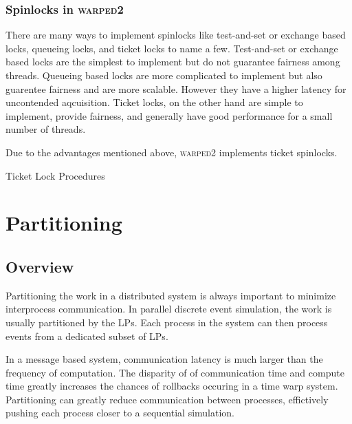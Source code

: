 \documentclass[11pt]{book}
\begin{document}
\subsection{Spinlocks in \textsc{warped2}}

There are many ways to implement spinlocks like test-and-set or exchange based locks,
queueing locks, and ticket locks to name a few. Test-and-set or exchange based locks are
the simplest to implement but do not guarantee fairness among threads. Queueing based locks
are more complicated to implement but also guarentee fairness and are more scalable. However
they have a higher latency for uncontended aqcuisition. Ticket locks, on the other hand
are simple to implement, provide fairness, and generally have good performance for a small
number of threads.

Due to the advantages mentioned above, \textsc{warped2} implements ticket spinlocks.

\begin{algorithm}
\DontPrintSemicolon
{}
\SetAlgoVlined

    \;

\caption{Ticket Lock Procedures}\label{ticket_lock}
\end{algorithm}



\chapter{Partitioning}\label{partitioning}

\section{Overview}

Partitioning the work in a distributed system is always important to minimize interprocess
communication. In parallel discrete event simulation, the work is usually partitioned by
the LPs. Each process in the system can then process events from a dedicated subset of LPs.

In a message based system, communication latency is much larger than the frequency of
computation. The disparity of of communication time and compute time greatly increases
the chances of rollbacks occuring in a time warp system. Partitioning can greatly reduce
communication between processes, effictively pushing each process closer to a sequential
simulation.
\end{document}

